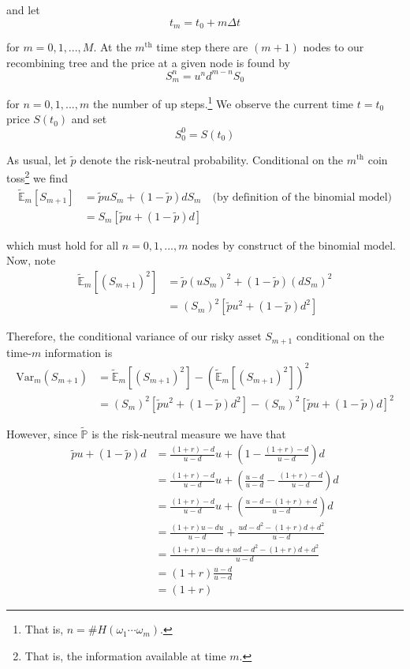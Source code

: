 \documentclass[12pt]{article}
\newlength\tindent
\renewcommand{\indent}{\hspace*{\tindent}}
\renewcommand{\P}{\mathbb P}
\newcommand{\E}{\mathbb E}
\newcommand{\Var}{\mathrm{Var}}
\begin{document}
and let
\begin{equation*}
	t_m = t_0 + m\Delta t
\end{equation*}

for $m = 0,1,...,M$. At the $m^{\text{th}}$ time step there are $(m + 1)$ nodes to our recombining tree and the price at a given node is found by
\begin{equation*}
	S^n_m = u^nd^{m - n}S_0
\end{equation*}	

for $n = 0,1,...,m$ the number of up steps.\footnote{That is, $n = \#H(\omega_1\cdots\omega_m)$.} We observe the current time $t = t_0$ price $S(t_0)$ and set
\begin{equation*}
	S^0_0 = S(t_0)
\end{equation*}

\indent As usual, let $\tilde{p}$ denote the risk-neutral probability. Conditional on the $m^\text{th}$ coin toss\footnote{That is, the information available at time $m$.} we find
\begin{align*}
	\tilde{\E}_m[S_{m + 1}]&= \tilde{p} u S_m + (1 - \tilde{p}) d S_m \quad \text{(by definition of the binomial model)} \\
	&= S_m[\tilde{p}u + (1 - \tilde{p})d]
\end{align*} 


which must hold for all $n = 0,1,...,m$ nodes by construct of the binomial model. Now, note
\begin{align*}
	\tilde{\E}_m[(S_{m + 1})^2] &= \tilde{p}(uS_m)^2 + (1 - \tilde{p})(dS_m)^2 \\
	&= (S_m)^2[\tilde{p}u^2 + (1 - \tilde{p})d^2]
\end{align*}

\indent Therefore, the conditional variance of our risky asset $S_{m + 1}$ conditional on the time-$m$ information is
\begin{align*}
	\Var_m(S_{m + 1}) &= \tilde{\E}_m[(S_{m + 1})^2] - \left( \tilde{\E}_m[(S_{m + 1})^2] \right)^2 \\
	&= (S_m)^2[\tilde{p}u^2 + (1 - \tilde{p})d^2] - (S_m)^2[\tilde{p}u + (1 - \tilde{p})d]^2
\end{align*}

However, since $\tilde{\P}$ is the risk-neutral measure we have that
\begin{align*}
	\tilde{p}u + (1 - \tilde{p})d &= \frac{(1 + r) - d}{u - d}u + \left(1 - \frac{(1 + r) - d}{u - d}\right)d \\
	&= \frac{(1 + r) - d}{u - d}u + \left(\frac{u - d}{u - d} - \frac{(1 + r) - d}{u - d}\right)d \\
	&= \frac{(1 + r) - d}{u - d}u + \left(\frac{u - d - (1 + r) + d}{u - d}\right)d \\
	&= \frac{(1 + r)u - du}{u - d} + \frac{ud - d^2 - (1 + r)d + d^2}{u - d} \\ 
	&= \frac{(1 + r)u - du + ud - d^2 - (1 + r)d + d^2}{u - d} \\ 
	&= (1 + r)\frac{u - d}{u - d} \\
	&= (1 + r)
\end{align*}
\end{document}
